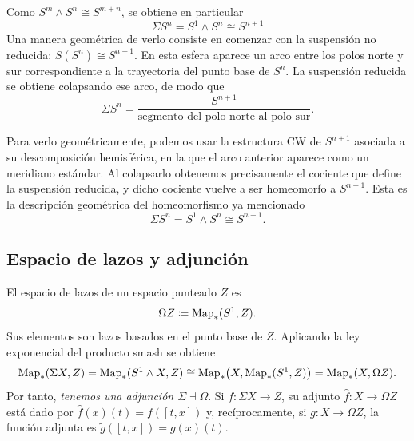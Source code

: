 
\begin{ejem}
Como \(S^m\wedge S^n\cong S^{m+n}\), se obtiene en particular
\[
\Sigma S^n=S^1\wedge S^n\cong S^{n+1}
\]
Una manera geométrica de verlo consiste en comenzar con la suspensión no reducida: \(S(S^n)\cong S^{n+1}\). En esta esfera aparece un arco entre los polos norte y sur correspondiente a la trayectoria del punto base de \(S^n\). La suspensión reducida se obtiene colapsando ese arco, de modo que
\[
\Sigma S^n=\frac{S^{n+1}}{\text{segmento del polo norte al polo sur}} .
\]

Para verlo geométricamente, podemos usar la estructura CW de \(S^{n+1}\) asociada a su descomposición hemisférica, en la que el arco anterior aparece como un meridiano estándar. Al colapsarlo obtenemos precisamente el cociente que define la suspensión reducida, y dicho cociente vuelve a ser homeomorfo a \(S^{n+1}\). Esta es la descripción geométrica del homeomorfismo ya mencionado
\[
\Sigma S^n=S^1\wedge S^n\cong S^{n+1}.
\]
\end{ejem}


\subsection{Espacio de lazos y adjunción}

El espacio de lazos de un espacio punteado \(Z\) es
\[
\Omega Z\coloneqq \operatorname{Map}_*(S^1,Z).
\]
Sus elementos son lazos basados en el punto base de \(Z\).
Aplicando la ley exponencial del producto smash se obtiene
\[
\begin{aligned}
\operatorname{Map}_*(\Sigma X,Z)
=\operatorname{Map}_*(S^1\wedge X,Z)
\cong \operatorname{Map}_*\bigl(X,\operatorname{Map}_*(S^1,Z)\bigr)
=\operatorname{Map}_*(X,\Omega Z).
\end{aligned}
\]
Por tanto, \emph{tenemos una adjunción $\Sigma \dashv \Omega$}.
Si \(f\colon\Sigma X\to Z\), su adjunto \(\widehat f\colon X\longrightarrow\Omega Z\) está dado por $\widehat f(x)(t)=f([t,x])$ y, recíprocamente, si \(g\colon X\to\Omega Z\), la función adjunta es $\widetilde g([t,x])=g(x)(t)$.

